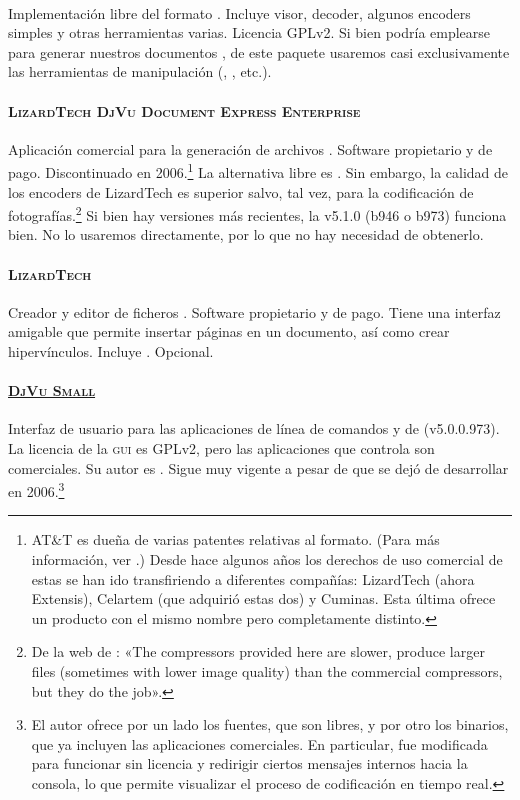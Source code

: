 \documentclass[%
	a5paper,
	10pt,
	twoside,
	openright,
	final,
]{memoir}
\begin{document}
	\paragraph{\href{http://djvu.sourceforge.net/}{\djvulibre}} Implementación libre del formato \djvu. Incluye visor, decoder, algunos encoders simples y otras herramientas varias. Licencia GPLv2. Si bien podría emplearse para generar nuestros documentos \djvu, de este paquete usaremos casi exclusivamente las herramientas de manipulación (, , etc.).
	\paragraph{\textsc{LizardTech DjVu Document Express Enterprise}} Aplicación comercial para la generación de archivos \djvu. Software propietario y de pago. Discontinuado en 2006.\footnote{AT\&T es dueña de varias patentes relativas al formato. (Para más información, ver \cite{DjVuLicensing, DjVuOpenSourceLicensing}.) Desde hace algunos años los derechos de uso comercial de estas se han ido transfiriendo a diferentes compañías: LizardTech (ahora Extensis), Celartem (que adquirió estas dos) y Cuminas. Esta última ofrece un producto con el mismo nombre pero completamente distinto.} La alternativa libre es \djvulibre. Sin embargo, la calidad de los encoders de LizardTech es superior salvo, tal vez, para la codificación de fotografías.\footnote{De la web de \djvulibre: «The compressors provided here are slower, produce larger files (sometimes with lower image quality) than the commercial compressors, but they do the job».} Si bien hay versiones más recientes, la v5.1.0 (b946 o b973) funciona bien. No lo usaremos directamente, por lo que no hay necesidad de obtenerlo.
	\paragraph{\textsc{LizardTech} \djvueditor} Creador y editor de ficheros \djvu. Software propietario y de pago. Tiene una interfaz amigable que permite insertar páginas en un documento, así como crear hipervínculos. Incluye \ocr. Opcional.
	\paragraph{\href{http://djvu-soft.narod.ru/scan/djvu_small.htm}{\textsc{DjVu Small}}} Interfaz de usuario para las aplicaciones de línea de comandos  y  de \dexpress (v5.0.0.973). La licencia de la \textsc{gui} es GPLv2, pero las aplicaciones que controla son comerciales. Su autor es \mondaytwothousand. Sigue muy vigente a pesar de que se dejó de desarrollar en 2006.\footnote{El autor ofrece por un lado los fuentes, que son libres, y por otro los binarios, que ya incluyen las aplicaciones comerciales. En particular,  fue modificada para funcionar sin licencia y redirigir ciertos mensajes internos hacia la consola, lo que permite visualizar el proceso de codificación en tiempo real.}
\end{document}
